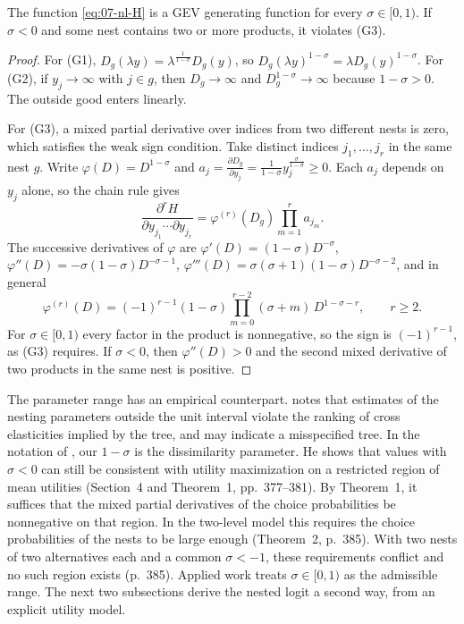\begin{lemma}\label{lem:07-nl-gev}
The function \eqref{eq:07-nl-H} is a GEV generating function for every $\sigma \in [0, 1)$. If $\sigma < 0$ and
some nest contains two or more products, it violates (G3).
\end{lemma}

\begin{proof}
For (G1), $D_g(\lambda y) = \lambda^{\frac{1}{1-\sigma}}D_g(y)$, so $D_g(\lambda y)^{1-\sigma} = \lambda D_g(y)^{1-\sigma}$.
For (G2), if $y_j \to \infty$ with $j \in g$, then $D_g \to \infty$ and $D_g^{1-\sigma} \to \infty$ because
$1 - \sigma > 0$. The outside good enters linearly.

For (G3), a mixed partial derivative over indices from two different nests is zero, which satisfies the weak sign
condition. Take distinct indices $j_1, \dots, j_r$ in the same nest $g$. Write $\varphi(D) = D^{1-\sigma}$ and
$a_j = \frac{\partial D_g}{\partial y_j} = \frac{1}{1-\sigma}y_j^{\frac{\sigma}{1-\sigma}} \ge 0$. Each $a_j$ depends on
$y_j$ alone, so the chain rule gives
\begin{equation*}
\frac{\partial^r H}{\partial y_{j_1}\cdots\partial y_{j_r}} = \varphi^{(r)}(D_g)\prod_{m=1}^r a_{j_m} .
\end{equation*}
The successive derivatives of $\varphi$ are $\varphi'(D) = (1-\sigma)D^{-\sigma}$,
$\varphi''(D) = -\sigma(1-\sigma)D^{-\sigma-1}$, $\varphi'''(D) = \sigma(\sigma+1)(1-\sigma)D^{-\sigma-2}$, and in general
\begin{equation*}
\varphi^{(r)}(D) = (-1)^{r-1}(1-\sigma)\prod_{m=0}^{r-2}(\sigma + m)\,D^{1-\sigma-r}, \qquad r \ge 2 .
\end{equation*}
For $\sigma \in [0, 1)$ every factor in the product is nonnegative, so the sign is $(-1)^{r-1}$, as (G3) requires.
If $\sigma < 0$, then $\varphi''(D) > 0$ and the second mixed derivative of two products in the same nest is
positive.
\end{proof}

The parameter range has an empirical counterpart. \citet[pp.~1425--1426]{McFadden1984} notes that estimates of
the nesting parameters outside the unit interval violate the ranking of cross elasticities implied by the tree,
and may indicate a misspecified tree. In the notation of \citet{BorschSupan1990}, our $1 - \sigma$ is the
dissimilarity parameter. He shows that values with $\sigma < 0$ can still be consistent with utility maximization
on a restricted region of mean utilities (Section~4 and Theorem~1, pp.~377--381). By Theorem~1, it suffices that
the mixed partial derivatives of the choice probabilities be nonnegative on that region. In the two-level model
this requires the choice probabilities of the nests to be large enough (Theorem~2, p.~385). With two nests of two
alternatives each and a common $\sigma < -1$, these requirements conflict and no such region exists (p.~385).
Applied work treats $\sigma \in [0, 1)$ as the admissible range. The next two subsections derive the nested logit a second way,
from an explicit utility model.

